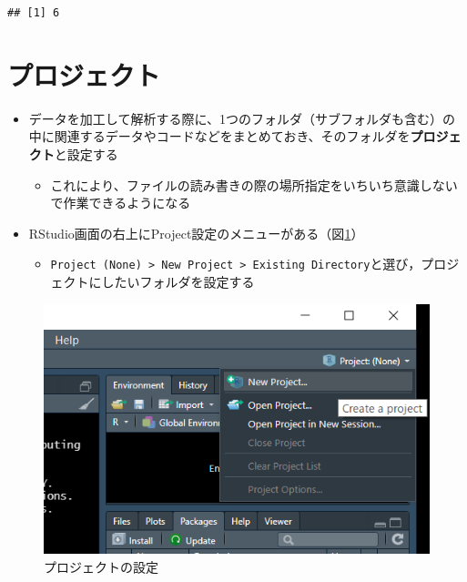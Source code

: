 \documentclass[
  xelatex,ja=standard, b5paper]{bxjsbook}
\providecommand{\tightlist}{%
  \setlength{\itemsep}{0pt}\setlength{\parskip}{0pt}}
\begin{document}
\begin{verbatim}
## [1] 6
\end{verbatim}

\hypertarget{p-project}{%
\section{プロジェクト}\label{p-project}}

\begin{itemize}
\tightlist
\item
  データを加工して解析する際に、1つのフォルダ（サブフォルダも含む）の中に関連するデータやコードなどをまとめておき、そのフォルダを\textbf{プロジェクト}と設定する

  \begin{itemize}
  \tightlist
  \item
    これにより、ファイルの読み書きの際の場所指定をいちいち意識しないで作業できるようになる
  \end{itemize}
\item
  RStudio画面の右上にProject設定のメニューがある（図\ref{fig:project}）

  \begin{itemize}
  \tightlist
  \item
    \texttt{Project\ (None)\ \textgreater{}\ New\ Project\ \textgreater{}\ Existing\ Directory}と選び，プロジェクトにしたいフォルダを設定する
  \end{itemize}
\end{itemize}

\begin{figure}

{\centering \includegraphics[width=7.11in]{images/project} 

}

\caption{プロジェクトの設定}\label{fig:project}
\end{figure}
\end{document}
